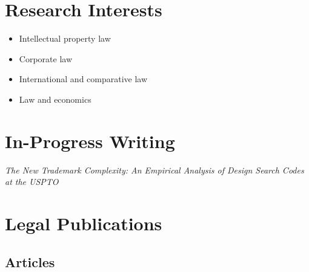 \documentclass[10pt]{article}
\newenvironment{gnoindent}
{\begin{adjustwidth}{10pt}{50pt}\setlength{\parindent}{0pt}}
{\end{adjustwidth}}
\newcommand{\years}[1]{\marginnote{\scriptsize #1}}
\begin{document}
\section*{Research Interests}

\begin{itemize}[itemsep = 0.25pt]
\item Intellectual property law
\item Corporate law
\item International and comparative law
\item Law and economics
\end{itemize}

\section*{In-Progress Writing}

\begin{gnoindent}
\years{2024} \textit{The New Trademark Complexity: An Empirical Analysis of Design Search Codes at the USPTO} \par
\end{gnoindent}

\section*{Legal Publications}

\subsection*{Articles}
\end{document}
